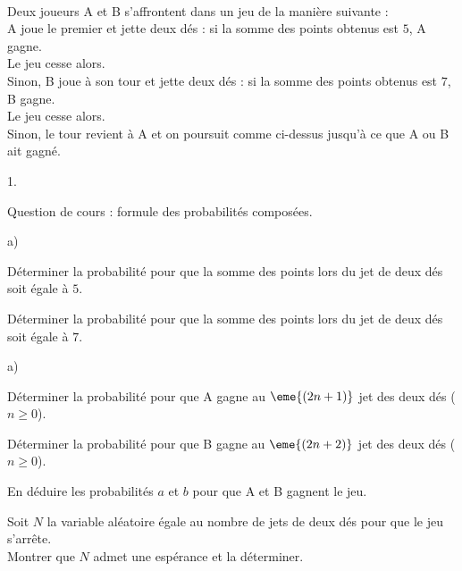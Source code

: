 \documentclass[11pt]{article}%
\begin{document}
\begin{exerciceAP}~\\
  Deux joueurs A et B s'affrontent dans un jeu de la manière suivante
  :\\
  A joue le premier et jette deux dés : si la somme des points obtenus
  est $5$, A gagne.\\
  Le jeu cesse alors.\\
  Sinon, B joue à son tour et jette deux dés : si la somme des points
  obtenus est $7$, B gagne.\\
  Le jeu cesse alors.\\
  Sinon, le tour revient à A et on poursuit comme ci-dessus jusqu'à ce
  que A ou B ait gagné.
  \begin{noliste}{1.}
  \item Question de cours : formule des probabilités composées.
    
  \item
    \begin{noliste}{a)}
    \item Déterminer la probabilité pour que la somme des points lors
      du jet de deux dés soit égale à $5$.
      
    \item Déterminer la probabilité pour que la somme des points lors
      du jet de deux dés soit égale à $7$.
    \end{noliste}
    
  \item
    \begin{noliste}{a)}
    \item Déterminer la probabilité pour que A gagne au $\eme{(2n+1)}$
      jet des deux dés ($n \geq 0$).
      
    \item Déterminer la probabilité pour que B gagne au $\eme{(2n+2)}$
      jet des deux dés ($n \geq 0$).
    \end{noliste}
    
  \item En déduire les probabilités $a$ et $b$ pour que A et B gagnent
    le jeu.
    
  \item Soit $N$ la variable aléatoire égale au nombre de jets de deux
    dés pour que le jeu s'arrête.\\
    Montrer que $N$ admet une espérance et la déterminer.
  \end{noliste}
\end{exerciceAP}
\end{document}
